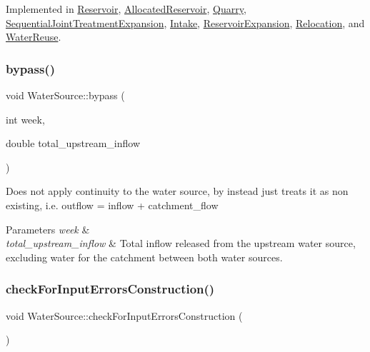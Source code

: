 Implemented in \mbox{\hyperlink{classReservoir_a66929c055193785bc9d47bcdf0bc7445}{Reservoir}}, \mbox{\hyperlink{classAllocatedReservoir_aa5a3683ac3a1e7a778627332c6a7fff7}{Allocated\+Reservoir}}, \mbox{\hyperlink{classQuarry_a6999b854a740ce92baaa610cf5b08bd9}{Quarry}}, \mbox{\hyperlink{classSequentialJointTreatmentExpansion_a64fdd68fc68f6b1145291575c2116815}{Sequential\+Joint\+Treatment\+Expansion}}, \mbox{\hyperlink{classIntake_acd5ab74c4091b286e69ecdcc495d83ce}{Intake}}, \mbox{\hyperlink{classReservoirExpansion_a18614050354dced5cc2747eeda0c2397}{Reservoir\+Expansion}}, \mbox{\hyperlink{classRelocation_af5c795c7b331b86b31c8bfa2ef9b6fe5}{Relocation}}, and \mbox{\hyperlink{classWaterReuse_ab8ffb10c69790047a3a5dda66cfaf3ee}{Water\+Reuse}}.

\mbox{\label{classWaterSource_abeb8ba4b51c2b270baf9162df76d8b58}} 
\subsubsection{\texorpdfstring{bypass()}{bypass()}}
{\footnotesize\ttfamily void Water\+Source\+::bypass (\begin{DoxyParamCaption}\item[{int}]{week,  }\item[{double}]{total\+\_\+upstream\+\_\+inflow }\end{DoxyParamCaption})\hspace{0.3cm}{\ttfamily [protected]}}

Does not apply continuity to the water source, by instead just treats it as non existing, i.\+e. outflow = inflow + catchment\+\_\+flow 
\begin{DoxyParams}{Parameters}
{\em week} & \\
\hline
{\em total\+\_\+upstream\+\_\+inflow} & Total inflow released from the upstream water source, excluding water for the catchment between both water sources. \\
\hline
\end{DoxyParams}
\mbox{\label{classWaterSource_a47bc2006a1ef6ea4429d56a24319940f}} 
\subsubsection{\texorpdfstring{check\+For\+Input\+Errors\+Construction()}{checkForInputErrorsConstruction()}}
{\footnotesize\ttfamily void Water\+Source\+::check\+For\+Input\+Errors\+Construction (\begin{DoxyParamCaption}{ }\end{DoxyParamCaption})}

